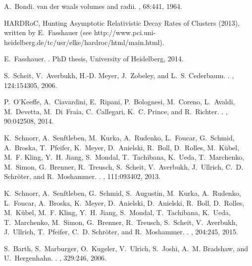 \documentclass[12pt,twocolumn]{iopart}
\begin{document}
\begin{thebibliography}{10}
A.~Bondi.
\newblock van der waals volumes and radii.
, 68:441, 1964.

{HARDRoC}, Hunting Asymptotic Relativistic Decay Rates of Clusters (2013),
  written by E.~Fasshauer (see
  http://www.pci.uni-heidelberg.de/tc/usr/elke/hardroc/html/main.html).

E.~Fasshauer.
.
\newblock PhD thesis, University of Heidelberg, 2014.

S.~Scheit, V.~Averbukh, H.-D. Meyer, J.~Zobeley, and L.~S. Cederbaum.
.
, 124:154305, 2006.

P.~O'Keeffe, A.~Ciavardini, E.~Ripani, P.~Bolognesi, M.~Coreno, L.~Avaldi,
  M.~Devetta, M.~Di~Fraia, C.~Callegari, K.~C. Prince, and R.~Richter.
.
, 90:042508, 2014.

K.~Schnorr, A.~Senftleben, M.~Kurka, A.~Rudenko, L.~Foucar, G.~Schmid,
  A.~Broska, T.~Pfeifer, K.~Meyer, D.~Anielski, R.~Boll, D.~Rolles,
  M.~K{\"u}bel, M.~F. Kling, Y.~H. Jiang, S.~Mondal, T.~Tachibana, K.~Ueda,
  T.~Marchenko, M.~Simon, G.~Brenner, R.~Treusch, S.~Scheit, V.~Averbukh,
  J.~Ullrich, C.~D. Schr{\"o}ter, and R.~Moshammer.
.
, 111:093402, 2013.

K.~Schnorr, A.~Senftleben, G.~Schmid, S.~Augustin, M.~Kurka, A.~Rudenko,
  L.~Foucar, A.~Broska, K.~Meyer, D.~Anielski, D.~Anielski, R.~Boll, D.~Rolles,
  M.~K{\"u}bel, M.~F. Kling, Y.~H. Jiang, S.~Mondal, T.~Tachibana, K.~Ueda,
  T.~Marchenko, M.~Simon, G.~Brenner, R.~Treusch, S.~Scheit, V.~Averbukh,
  J.~Ullrich, T.~Pfeifer, C.~D. Schr{\"o}ter, and R.~Moshammer.
.
, 204:245, 2015.

S.~Barth, S.~Marburger, O.~Kugeler, V.~Ulrich, S.~Joshi, A.~M. Bradshaw, and
  U.~Hergenhahn.
.
, 329:246, 2006.

\end{thebibliography}


\end{document}
